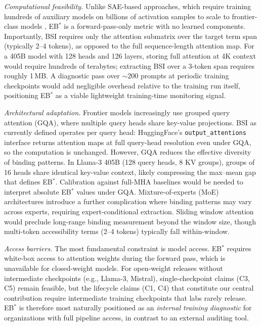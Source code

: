 \documentclass[10pt]{article} %
\begin{document}
\begin{enumerate}
  \emph{Computational feasibility.} Unlike SAE-based approaches, which require training hundreds of auxiliary models on billions of activation samples to scale to frontier-class models \citep{templeton2024monosemanticity,lieberum2024gemma}, EB$^*$ is a forward-pass-only metric with no learned components. Importantly, BSI requires only the attention submatrix over the target term span (typically 2--4 tokens), as opposed to the full sequence-length attention map. For a 405B model with 128 heads and 126 layers, storing full attention at 4K context would require hundreds of terabytes; extracting BSI over a 3-token span requires roughly 1\,MB. A diagnostic pass over ${\sim}200$ prompts at periodic training checkpoints would add negligible overhead relative to the training run itself, positioning EB$^*$ as a viable lightweight training-time monitoring signal.

  \emph{Architectural adaptation.} Frontier models increasingly use grouped query attention (GQA), where multiple query heads share key-value projections. BSI as currently defined operates per query head: HuggingFace's \texttt{output\_attentions} interface returns attention maps at full query-head resolution even under GQA, so the computation is unchanged. However, GQA reduces the effective diversity of binding patterns. In Llama-3 405B (128 query heads, 8 KV groups), groups of 16 heads share identical key-value context, likely compressing the max--mean gap that defines EB$^*$. Calibration against full-MHA baselines would be needed to interpret absolute EB$^*$ values under GQA. Mixture-of-experts (MoE) architectures introduce a further complication where binding patterns may vary across experts, requiring expert-conditional extraction. Sliding window attention would preclude long-range binding measurement beyond the window size, though multi-token accessibility terms (2--4 tokens) typically fall within-window.

  \emph{Access barriers.} The most fundamental constraint is model access. EB$^*$ requires white-box access to attention weights during the forward pass, which is unavailable for closed-weight models. For open-weight releases without intermediate checkpoints (e.g., Llama-3, Mistral), single-checkpoint claims (C3, C5) remain feasible, but the lifecycle claims (C1, C4) that constitute our central contribution require intermediate training checkpoints that labs rarely release. EB$^*$ is therefore most naturally positioned as an \emph{internal training diagnostic} for organizations with full pipeline access, in contrast to an external auditing tool.


\end{enumerate}
\end{document}

